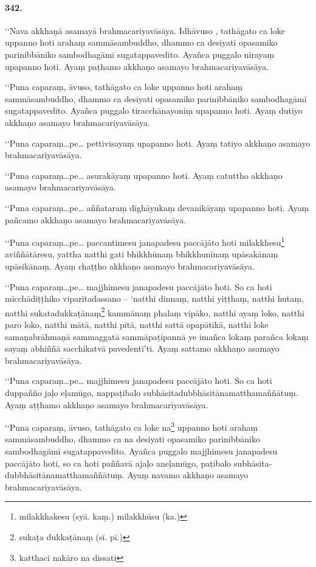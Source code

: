 \paragraph{342.} ‘‘Nava akkhaṇā asamayā brahmacariyavāsāya. Idhāvuso , tathāgato ca loke uppanno hoti arahaṃ sammāsambuddho, dhammo ca desiyati opasamiko parinibbāniko sambodhagāmī sugatappavedito. Ayañca puggalo nirayaṃ upapanno hoti. Ayaṃ paṭhamo akkhaṇo asamayo brahmacariyavāsāya.

‘‘Puna caparaṃ, āvuso, tathāgato ca loke uppanno hoti arahaṃ sammāsambuddho, dhammo ca desiyati opasamiko parinibbāniko sambodhagāmī sugatappavedito. Ayañca puggalo tiracchānayoniṃ upapanno hoti. Ayaṃ dutiyo akkhaṇo asamayo brahmacariyavāsāya.

‘‘Puna caparaṃ…pe… pettivisayaṃ upapanno hoti. Ayaṃ tatiyo akkhaṇo asamayo brahmacariyavāsāya.

‘‘Puna caparaṃ…pe… asurakāyaṃ upapanno hoti. Ayaṃ catuttho akkhaṇo asamayo brahmacariyavāsāya.

‘‘Puna caparaṃ…pe… aññataraṃ dīghāyukaṃ devanikāyaṃ upapanno hoti. Ayaṃ pañcamo akkhaṇo asamayo brahmacariyavāsāya.

‘‘Puna caparaṃ…pe… paccantimesu janapadesu paccājāto hoti milakkhesu\footnote{milakkhakesu (syā. kaṃ.) milakkhūsu (ka.)} aviññātāresu, yattha natthi gati bhikkhūnaṃ bhikkhunīnaṃ upāsakānaṃ upāsikānaṃ. Ayaṃ chaṭṭho akkhaṇo asamayo brahmacariyavāsāya.

‘‘Puna caparaṃ…pe… majjhimesu janapadesu paccājāto hoti. So ca hoti micchādiṭṭhiko viparītadassano – ‘natthi dinnaṃ, natthi yiṭṭhaṃ, natthi hutaṃ, natthi sukatadukkaṭānaṃ\footnote{sukaṭa dukkaṭānaṃ (sī. pī.)} kammānaṃ phalaṃ vipāko, natthi ayaṃ loko, natthi paro loko, natthi mātā, natthi pitā, natthi sattā opapātikā, natthi loke samaṇabrāhmaṇā sammaggatā sammāpaṭipannā ye imañca lokaṃ parañca lokaṃ sayaṃ abhiññā sacchikatvā pavedentī’ti. Ayaṃ sattamo akkhaṇo asamayo brahmacariyavāsāya.

‘‘Puna caparaṃ…pe… majjhimesu janapadesu paccājāto hoti. So ca hoti duppañño jaḷo eḷamūgo, nappaṭibalo subhāsitadubbhāsitānamatthamaññātuṃ. Ayaṃ aṭṭhamo akkhaṇo asamayo brahmacariyavāsāya.

‘‘Puna caparaṃ, āvuso, tathāgato ca loke na\footnote{katthaci nakāro na dissati} uppanno hoti arahaṃ sammāsambuddho, dhammo ca na desiyati opasamiko parinibbāniko sambodhagāmī sugatappavedito. Ayañca puggalo majjhimesu janapadesu paccājāto hoti, so ca hoti paññavā ajaḷo aneḷamūgo, paṭibalo subhāsita-dubbhāsitānamatthamaññātuṃ. Ayaṃ navamo akkhaṇo asamayo brahmacariyavāsāya.

